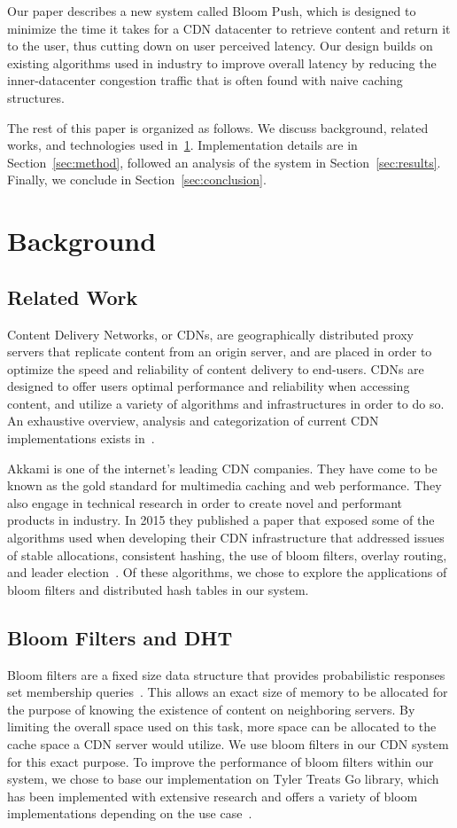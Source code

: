\documentclass[conference]{IEEEtran}
\begin{document}
Our paper describes a new system called Bloom Push, which is designed to minimize the time it takes for a CDN datacenter to retrieve content and return it to the user, thus cutting down on user perceived latency.  Our design builds on existing algorithms used in industry to improve overall latency by reducing the inner-datacenter congestion traffic that is often found with naive caching structures.

The rest of this paper is organized as follows.  We discuss background, related works, and technologies used in~\ref{sec:back}.  Implementation details are in Section~\ref{sec:method}, followed an analysis of the system in Section~\ref{sec:results}.  Finally, we conclude in Section~\ref{sec:conclusion}. 

\section{Background}\label{sec:back}
\subsection*{Related Work}
Content Delivery Networks, or CDNs, are geographically distributed proxy servers that replicate content from an origin server, and are placed in order to optimize the speed and reliability of content delivery to end-users. CDNs are designed to offer users optimal performance and reliability when accessing content, and utilize a variety of algorithms and infrastructures in order to do so. An exhaustive overview, analysis and categorization of current CDN implementations exists in~\cite{PathanTaxonomy}. 

Akkami is one of the internet's leading CDN companies.  They have come to be known as the gold standard for multimedia caching and web performance. They also engage in technical research in order to create novel and performant products in industry. In 2015 they published a paper that exposed some of the algorithms used when developing their CDN infrastructure that addressed issues of stable allocations, consistent hashing, the use of bloom filters, overlay routing, and leader election~\cite{MaggsNuggets}.  Of these algorithms, we chose to explore the applications of bloom filters and distributed hash tables in our system.

\subsection*{Bloom Filters and DHT}
Bloom filters are a fixed size data structure that provides probabilistic responses set membership queries~\cite{BroderBloom}.  This allows an exact size of memory to be allocated for the purpose of knowing the existence of content on neighboring servers.  By limiting the overall space used on this task, more space can be allocated to the cache space a CDN server would utilize.  We use bloom filters in our CDN system for this exact purpose.  To improve the performance of bloom filters within our system, we chose to base our implementation on Tyler Treats Go library, which has been implemented with extensive research and offers a variety of bloom implementations depending on the use case~\cite{TreatBloom}.
\end{document}
